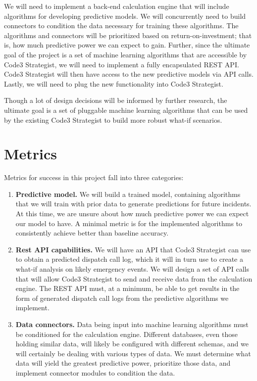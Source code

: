 \documentclass[onecolumn, draftclsnofoot,10pt, compsoc]{IEEEtran}
\begin{document}
We will need to implement a back-end calculation engine that will include algorithms for developing predictive models.
We will concurrently need to build connectors to condition the data necessary for training these algorithms.
The algorithms and connectors will be prioritized based on return-on-investment; that is, how much predictive power we can expect to gain.
Further, since the ultimate goal of the project is a set of machine learning algorithms that are accessible by Code3 Strategist, we will need to implement a fully encapsulated REST API.
Code3 Strategist will then have access to the new predictive models via API calls.
Lastly, we will need to plug the new functionality into Code3 Strategist. \par

Though a lot of design decisions will be informed by further research, the ultimate goal is a set of pluggable machine learning algorithms that can be used by the existing Code3 Strategist to build more robust what-if scenarios.

\section{Metrics}
Metrics for success in this project fall into three categories:

\begin{enumerate}
    \item \textbf{Predictive model.} 
    We will build a trained model, containing algorithms that we will train with prior data to generate predictions for future incidents. 
    At this time, we are unsure about how much predictive power we can expect our model to have. 
    A minimal metric is for the implemented algorithms to consistently achieve better than baseline accuracy.
    
    \item \textbf{Rest API capabilities.} We will have an API that Code3 Strategist can use to obtain a predicted dispatch call log, which it will in turn use to create a what-if analysis on likely emergency events. We will design a set of API calls that will allow Code3 Strategist to send and receive data from the calculation engine. The REST API must, at a minimum, be able to get results in the form of generated dispatch call logs from the predictive algorithms we implement.
    
    \item \textbf{Data connectors.} Data being input into machine learning algorithms must be conditioned for the calculation engine. Different databases, even those holding similar data, will likely be configured with different schemas, and we will certainly be dealing with various types of data. We must determine what data will yield the greatest predictive power, prioritize those data, and implement connector modules to condition the data. 
    
    
\end{enumerate}
\end{document}
